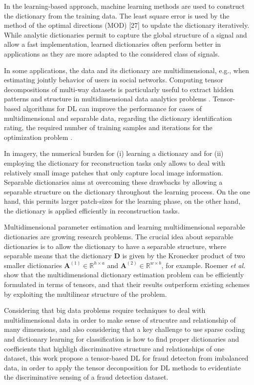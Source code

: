 In the learning-based approach, machine learning methods are used to construct the dictionary from the training data. The least square error is used by the method of the optimal directions (MOD) [27] to update the dictionary iteratively. While analytic dictionaries permit to capture the global structure of a signal and allow a fast implementation, learned dictionaries often perform better in applications as they are more adapted to the considered class of signals.

In some applications, the data and its dictionary are multidimensional, e.g., when estimating jointly behavior of users in social networks. Computing tensor decompositions of multi-way datasets is particularly useful to extract hidden patterns and structure in multidimensional data analytics problems \cite{kolda2009tensor}. Tensor-based algorithms for DL can improve the performance for cases of multidimensional and separable data, regarding the dictionary identification rating, the required number of training samples and iterations for the optimization problem \cite{roemer2014tensor}. 

In imagery, the numerical burden for (i) learning a dictionary and for (ii) employing the dictionary for reconstruction tasks only allows to deal with relatively small image patches that only capture local image information. Separable dictionaries aims at overcoming these drawbacks by allowing a separable structure on the dictionary throughout the learning process. On the one hand, this permits larger patch-sizes for the learning phase, on the other hand, the dictionary is applied efficiently in reconstruction tasks. 

Multidimensional parameter estimation and learning multidimensional separable dictionaries are growing research problems. The crucial idea about separable dictionaries is to allow the dictionary to have a separable structure, where separable means that the dictionary $\textbf{D}$ is given by the Kronecker product of two smaller dictionaries $\boldsymbol{A}^{(1)} \in \mathbb{R}^{h \times a}$ and $\boldsymbol{A}^{(2)} \in \mathbb{R}^{w \times b}$, for example. Roemer \emph{et al.} \cite{roemer2014tensor} show that the multidimensional dictionary estimation problem can be efficiently formulated in terms of tensors, and that their results outperform existing schemes by exploiting the multilinear structure of the problem.

Considering that big data problems require techniques to deal with multidimensional data in order to make sense of strucutre and relationship of many dimensions, and also considering that a key challenge to use sparse coding and dictionary learning for classification is how to find proper dictionaries and coefficients that highligh discriminative structure and relationships of one dataset, this work propose a tensor-based DL for fraud detecton from imbalanced data, in order to apply the tensor deconposition for DL methods to evidentiate the discriminative sensing of a fraud detection dataset. 

